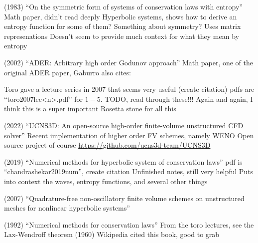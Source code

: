 \begin{outline}
  \1 (1983) ``On the symmetric form of systems of conservation laws with entropy'' \cite{harten1983symmetric}
  \2 Math paper, didn't read deeply
  \2 Hyperbolic systems, shows how to derive an entropy function for some of them? Something about symmetry? Uses matrix represenations
  \2 Doesn't seem to provide much context for what they mean by entropy

  \1 (2002) ``ADER: Arbitrary high order Godunov approach'' \cite{titarev2002ader}
  \2 Math paper, one of the original ADER paper, Gaburro also cites:

  \1 Toro gave a lecture series in 2007 that seems very useful (create citation) 
  \2 pdfs are ``toro2007lec<n>.pdf'' for $1-5$.
  \2 TODO, read through these!!! Again and again, I think this is a super important Rosetta stone for all this

\1 (2022) ``UCNS3D: An open-source high-order finite-volume unstructured CFD solver'' \cite{antoniadis2022ucns3d}
\2 Recent implementation of higher order FV schemes, namely WENO 
\2 Open source project of course \url{https://github.com/ucns3d-team/UCNS3D}

\1 (2019) ``Numerical methods for hyperbolic system of conservation laws'' 
\2 pdf is ``chandrashekar2019num'', create citation
\2 Unfinished notes, still very helpful
\2 Puts into context the waves, entropy functions, and several other things

\1 (2007) ``Quadrature-free non-oscillatory finite volume schemes on unstructured meshes for nonlinear hyperbolic systems'' \cite{dumbser2007quadrature}

\1 (1992) ``Numerical methods for conservation laws''  \cite{leveque1992numerical}
\2 From the toro lectures, see the Lax-Wendroff theorem (1960)
\2 Wikipedia cited this book, good to grab

\end{outline}



